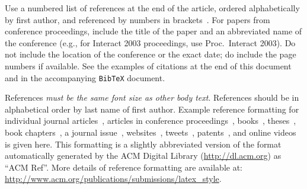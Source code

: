 \documentclass{sigchi-ext}
\begin{document}
    Use a numbered list of references at the end of the article, ordered
    alphabetically by first author, and referenced by numbers in
    brackets~\cite{ethics,Klemmer:2002:WSC:503376.503378}. For papers from
    conference proceedings, include the title of the paper and an
    abbreviated name of the conference (e.g., for Interact 2003
    proceedings, use Proc.\ Interact 2003). Do not include the location of
    the conference or the exact date; do include the page numbers if
    available. See the examples of citations at the end of this document
    and in the accompanying \texttt{BibTeX} document.
    
    References \textit{must be the same font size as other body
      text}. References should be in alphabetical order by last name of
    first author. Example reference formatting for individual journal
    articles~\cite{ethics}, articles in conference
    proceedings~\cite{Klemmer:2002:WSC:503376.503378},
    books~\cite{Schwartz:1995:GBF}, theses~\cite{sutherland:sketchpad},
    book chapters~\cite{winner:politics}, a journal issue~\cite{kaye:puc},
    websites~\cite{acm_categories,cavender:writing},
    tweets~\cite{CHINOSAUR:venue}, patents~\cite{heilig:sensorama}, and
    online videos~\cite{psy:gangnam} is given here. This formatting is a
    slightly abbreviated version of the format automatically generated by
    the ACM Digital Library (\url{http://dl.acm.org}) as ``ACM Ref''. More
    details of reference formatting are available at:
    \url{http://www.acm.org/publications/submissions/latex_style}.
\fi

\balance{} 

% 

% 

\end{document}
